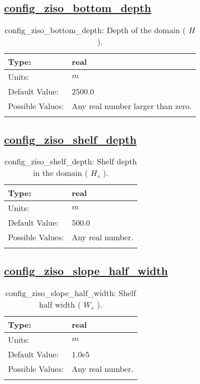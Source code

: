 \subsection[config\_ziso\_bottom\_depth]{\hyperref[sec:nm_tab_ziso]{config\_ziso\_bottom\_depth}}
\label{subsec:nm_sec_config_ziso_bottom_depth}
\begin{center}
\begin{longtable}{| p{2.0in} || p{4.0in} |}
    \hline
    Type: & real \\
    \hline
    Units: & $m$ \\
    \hline
    Default Value: & 2500.0 \\
    \hline
    Possible Values: & Any real number larger than zero. \\
    \hline
    \caption{config\_ziso\_bottom\_depth:  Depth of the domain ( $H$ ).}
\end{longtable}
\end{center}
\subsection[config\_ziso\_shelf\_depth]{\hyperref[sec:nm_tab_ziso]{config\_ziso\_shelf\_depth}}
\label{subsec:nm_sec_config_ziso_shelf_depth}
\begin{center}
\begin{longtable}{| p{2.0in} || p{4.0in} |}
    \hline
    Type: & real \\
    \hline
    Units: & $m$ \\
    \hline
    Default Value: & 500.0 \\
    \hline
    Possible Values: & Any real number. \\
    \hline
    \caption{config\_ziso\_shelf\_depth:  Shelf depth in the domain ( $H_s$ ).}
\end{longtable}
\end{center}
\subsection[config\_ziso\_slope\_half\_width]{\hyperref[sec:nm_tab_ziso]{config\_ziso\_slope\_half\_width}}
\label{subsec:nm_sec_config_ziso_slope_half_width}
\begin{center}
\begin{longtable}{| p{2.0in} || p{4.0in} |}
    \hline
    Type: & real \\
    \hline
    Units: & $m$ \\
    \hline
    Default Value: & 1.0e5 \\
    \hline
    Possible Values: & Any real number. \\
    \hline
    \caption{config\_ziso\_slope\_half\_width:  Shelf half width ( $W_s$ ).}
\end{longtable}
\end{center}
